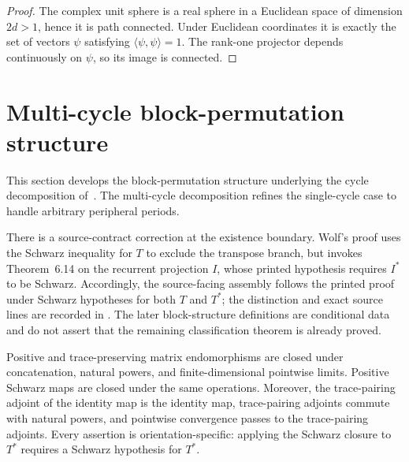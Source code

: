 \begin{proof}
    \leanok
    The complex unit sphere is a real sphere in a Euclidean space of
    dimension $2d>1$, hence it is path connected. Under Euclidean
    coordinates it is exactly the set of vectors $\psi$ satisfying
    $\langle\psi,\psi\rangle=1$. The rank-one projector depends
    continuously on $\psi$, so its image is connected.
\end{proof}

\section{Multi-cycle block-permutation structure}

This section develops the block-permutation structure underlying the
cycle decomposition of~\cite[Theorem~6.16]{Wolf2012Quantum}. The
multi-cycle decomposition refines the single-cycle case to handle
arbitrary peripheral periods.

There is a source-contract correction at the existence boundary.  Wolf's
proof uses the Schwarz inequality for $T$ to exclude the transpose branch,
but invokes Theorem~6.14 on the recurrent projection $I$, whose printed
hypothesis requires $I^*$ to be Schwarz.  Accordingly, the source-facing
assembly follows the printed proof under Schwarz hypotheses for both $T$ and
$T^*$; the distinction and exact source lines are recorded in
\cite{gap:wolf_theorem6_16_schwarz_orientation}.  The later block-structure
definitions are conditional data and do not assert that the remaining
classification theorem is already proved.

\begin{lemma}
    \label{lem:positive_trace_schwarz_limit_closure}
    \leanok
    Positive and trace-preserving matrix endomorphisms are closed under
    concatenation, natural powers, and finite-dimensional pointwise limits.
    Positive Schwarz maps are closed under the same operations. Moreover,
    the trace-pairing adjoint of the identity map is the identity map,
    trace-pairing adjoints commute with natural powers, and pointwise
    convergence passes to the trace-pairing adjoints.
    Every assertion is orientation-specific: applying the Schwarz closure to
    $T^*$ requires a Schwarz hypothesis for $T^*$.
\end{lemma}

